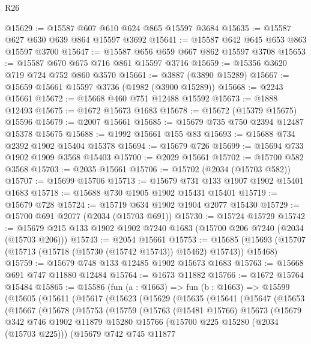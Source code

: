 \begin{lexlean}{R26}
\begin{coremodule}
@15629 := @15587 @607 @610 @624 @865 @15597 @3684
@15635 := @15587 @627 @630 @639 @864 @15597 @3692
@15641 := @15587 @642 @645 @653 @863 @15597 @3700
@15647 := @15587 @656 @659 @667 @862 @15597 @3708
@15653 := @15587 @670 @675 @716 @861 @15597 @3716
@15659 := @15356 @3620 @719 @724 @752 @860 @3570
@15661 := @3887 (@3890 @15289)
@15667 := @15659 @15661 @15597 @3736 (@1982 (@3900 @15289))
@15668 := @2243 @15661
@15672 := @15668 @460 @751 @12488 @15592
@15673 := @1888 @12493
@15675 := @1672 @15673 @1683
@15678 := @15672 (@15379 @15675) @15596
@15679 := @2007 @15661
@15685 := @15679 @735 @750 @2394 @12487 @15378 @15675
@15688 := @1992 @15661 @155 @83
@15693 := @15688 @734 @2392 @1902 @15404 @15378
@15694 := @15679 @726
@15699 := @15694 @733 @1902 @1909 @3568 @15403
@15700 := @2029 @15661
@15702 := @15700 @582 @3568
@15703 := @2035 @15661
@15706 := @15702 (@2034 (@15703 @582))
@15707 := @15699 @15706
@15713 := @15679 @731 @133 @1907 @1902 @15401 @1683
@15718 := @15688 @730 @1905 @1902 @15431 @15401
@15719 := @15679 @728
@15724 := @15719 @634 @1902 @1904 @2077 @15430
@15729 := @15700 @691 @2077 (@2034 (@15703 @691))
@15730 := @15724 @15729
@15742 := @15679 @215 @133 @1902 @1902 @7240 @1683 (@15700 @206 @7240 (@2034 (@15703 @206)))
@15743 := @2054 @15661
@15753 := @15685 (@15693 (@15707 (@15713 (@15718 (@15730 (@15742 @15743)) @15462) @15743)) @15468)
@15759 := @15679 @748 @133 @12485 @1902 @15673 @1683
@15763 := @15668 @691 @747 @11880 @12484
@15764 := @1673 @11882
@15766 := @1672 @15764 @15484
@15865 := @15586
    (fun (a : @1663) =>
    fun (b : @1663) =>
    @15599
      (@15605
        (@15611
          (@15617
            (@15623
              (@15629
                (@15635
                  (@15641
                    (@15647
                      (@15653
                        (@15667
                          (@15678
                            (@15753
                              (@15759
                                (@15763
                                  (@15481 @15766)
                                  @15673
                                  (@15679
                                    @342
                                    @746
                                    @1902
                                    @11879
                                    @15280
                                    @15766
                                    (@15700 @225 @15280 (@2034 (@15703 @225)))
                                    (@15679
                                      @742
                                      @745
                                      @11877

\end{coremodule}
\end{lexlean}

